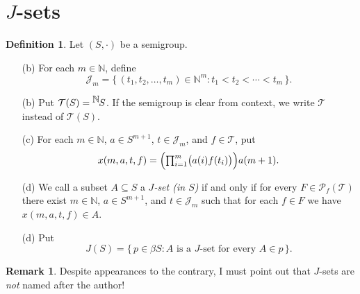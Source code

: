 \documentclass[12pt]{article}
\theoremstyle{plain}
\theoremstyle{definition}
\newtheorem{defn}[thm]{Definition}
\newtheorem{rmk}[thm]{Remark}
\newcommand{\bbN}{\mathbb{N}}
\newcommand{\calJ}{\mathcal{J}}
\newcommand{\calT}{\mathcal{T}}
\newcommand{\Pf}{\mathcal{P}_f}
\newcommand{\setfunc}[2]{\hbox{${}^{\hbox{$#1$}}\hskip -1 pt #2$}}
\begin{document}
\section{$J$-sets}
\begin{defn}
  Let $(S, \cdot)$ be a semigroup.
  \begin{itemize}
    \item[(b)] For each $m \in \bbN$, define
      \[
        \calJ_m = \{\, (t_1, t_2, \ldots, t_m) \in \bbN^m : t_1 < t_2 < \cdots < t_m \,\}.
      \]

    \item[(b)] Put $\calT(S) = \setfunc{\bbN}{S}$.
      If the semigroup is clear from context, we write $\calT$ instead of $\calT(S)$.

    \item[(c)] For each $m \in \bbN$, $a \in S^{m+1}$, $t \in \calJ_m$, and $f \in \calT$, put
      \[
        \textstyle
        x(m, a, t, f) = \Bigl( \prod_{i=1}^m \bigl( a(i)f(t_i) \bigr) \Bigr)a(m+1).
      \]

    \item[(d)] We call a subset $A \subseteq S$ a \textsl{$J$-set (in $S$)} if and only if for every $F \in \Pf(\calT)$ there exist $m \in \bbN$, $a \in S^{m+1}$, and $t \in \calJ_m$ such that for each $f \in F$ we have $x(m, a, t, f) \in A$.

    \item[(d)] Put
      \[
        J(S) = \{\, p \in \beta S : \mbox{$A$ is a $J$-set for every $A \in p$} \,\}.
      \]
  \end{itemize}
\end{defn}
\begin{rmk}
  Despite appearances to the contrary, I must point out that $J$-sets are \textsl{not} named after the author!
\end{rmk}
\end{document}
